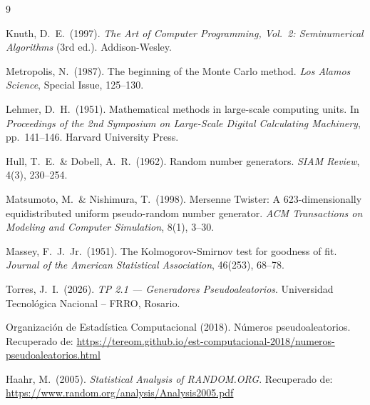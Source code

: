 \documentclass{article}
\begin{document}
\begin{thebibliography}{9}

  Knuth, D.\ E.\ (1997).
  \textit{The Art of Computer Programming, Vol.~2: Seminumerical Algorithms}
  (3rd ed.).
  Addison-Wesley.

  Metropolis, N.\ (1987).
  The beginning of the Monte Carlo method.
  \textit{Los Alamos Science}, Special Issue, 125--130.

  Lehmer, D.\ H.\ (1951).
  Mathematical methods in large-scale computing units.
  In \textit{Proceedings of the 2nd Symposium on Large-Scale Digital
  Calculating Machinery}, pp.~141--146.
  Harvard University Press.

  Hull, T.\ E.\ \& Dobell, A.\ R.\ (1962).
  Random number generators.
  \textit{SIAM Review}, 4(3), 230--254.

  Matsumoto, M.\ \& Nishimura, T.\ (1998).
  Mersenne Twister: A 623-dimensionally equidistributed uniform
  pseudo-random number generator.
  \textit{ACM Transactions on Modeling and Computer Simulation},
  8(1), 3--30.

  Massey, F.\ J.\ Jr.\ (1951).
  The Kolmogorov-Smirnov test for goodness of fit.
  \textit{Journal of the American Statistical Association},
  46(253), 68--78.

  Torres, J.\ I.\ (2026).
  \textit{TP 2.1 --- Generadores Pseudoaleatorios}.
  Universidad Tecnológica Nacional -- FRRO, Rosario.

  Organización de Estadística Computacional (2018).
  Números pseudoaleatorios.
  Recuperado de:
  \url{https://tereom.github.io/est-computacional-2018/numeros-pseudoaleatorios.html}

  Haahr, M.\ (2005).
  \textit{Statistical Analysis of RANDOM.ORG}.
  Recuperado de:
  \url{https://www.random.org/analysis/Analysis2005.pdf}

\end{thebibliography}
\end{document}
